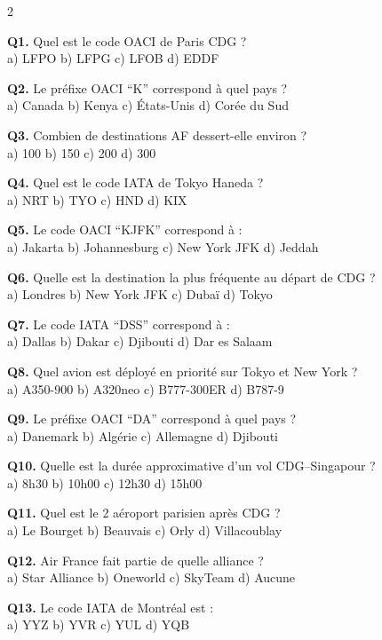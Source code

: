 \documentclass[9pt,a4paper,landscape]{article}
\begin{document}
\begin{multicols}{2}
\scriptsize

\textbf{Q1.} Quel est le code OACI de Paris CDG ?\\
a) LFPO \quad b) LFPG \quad c) LFOB \quad d) EDDF

\textbf{Q2.} Le préfixe OACI ``K'' correspond à quel pays ?\\
a) Canada \quad b) Kenya \quad c) États-Unis \quad d) Corée du Sud

\textbf{Q3.} Combien de destinations AF dessert-elle environ ?\\
a) 100 \quad b) 150 \quad c) 200 \quad d) 300

\textbf{Q4.} Quel est le code IATA de Tokyo Haneda ?\\
a) NRT \quad b) TYO \quad c) HND \quad d) KIX

\textbf{Q5.} Le code OACI ``KJFK'' correspond à :  \\
a) Jakarta \quad b) Johannesburg \quad c) New York JFK \quad d) Jeddah

\textbf{Q6.} Quelle est la destination la plus fréquente au départ de CDG ?\\
a) Londres \quad b) New York JFK \quad c) Dubaï \quad d) Tokyo

\textbf{Q7.} Le code IATA ``DSS'' correspond à :  \\
a) Dallas \quad b) Dakar \quad c) Djibouti \quad d) Dar es Salaam

\textbf{Q8.} Quel avion est déployé en priorité sur Tokyo et New York ?\\
a) A350-900 \quad b) A320neo \quad c) B777-300ER \quad d) B787-9

\textbf{Q9.} Le préfixe OACI ``DA'' correspond à quel pays ?\\
a) Danemark \quad b) Algérie \quad c) Allemagne \quad d) Djibouti

\textbf{Q10.} Quelle est la durée approximative d'un vol CDG--Singapour ?\\
a) 8h30 \quad b) 10h00 \quad c) 12h30 \quad d) 15h00

\textbf{Q11.} Quel est le 2 aéroport parisien après CDG ?\\
a) Le Bourget \quad b) Beauvais \quad c) Orly \quad d) Villacoublay

\textbf{Q12.} Air France fait partie de quelle alliance ?\\
a) Star Alliance \quad b) Oneworld \quad c) SkyTeam \quad d) Aucune

\textbf{Q13.} Le code IATA de Montréal est :  \\
a) YYZ \quad b) YVR \quad c) YUL \quad d) YQB


\end{multicols}
\end{document}
